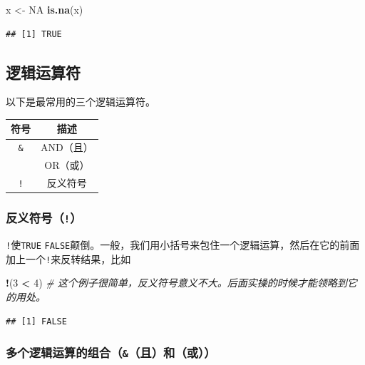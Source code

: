 \documentclass[]{book}
\newenvironment{Shaded}{\begin{snugshade}}{\end{snugshade}}
\newcommand{\CommentTok}[1]{\textcolor[rgb]{0.56,0.35,0.01}{\textit{#1}}}
\newcommand{\DecValTok}[1]{\textcolor[rgb]{0.00,0.00,0.81}{#1}}
\newcommand{\KeywordTok}[1]{\textcolor[rgb]{0.13,0.29,0.53}{\textbf{#1}}}
\newcommand{\NormalTok}[1]{#1}
\newcommand{\OperatorTok}[1]{\textcolor[rgb]{0.81,0.36,0.00}{\textbf{#1}}}
\newcommand{\OtherTok}[1]{\textcolor[rgb]{0.56,0.35,0.01}{#1}}
\newcommand{\StringTok}[1]{\textcolor[rgb]{0.31,0.60,0.02}{#1}}
\begin{document}
\begin{Shaded}
\begin{Highlighting}[]
\NormalTok{x <-}\StringTok{ }\OtherTok{NA}
\KeywordTok{is.na}\NormalTok{(x)}
\end{Highlighting}
\end{Shaded}

\begin{verbatim}
## [1] TRUE
\end{verbatim}

\hypertarget{logical-logical-operators}{%
\subsection{逻辑运算符}\label{logical-logical-operators}}

以下是最常用的三个逻辑运算符。

\begin{longtable}[]{@{}cc@{}}
\toprule
符号 & 描述\tabularnewline
\midrule
\endhead
\texttt{\&} & AND（且）\tabularnewline
\texttt{\textbar{}} & OR（或）\tabularnewline
\texttt{!} & 反义符号\tabularnewline
\bottomrule
\end{longtable}

\hypertarget{logical-logical-operators-anti}{%
\subsubsection{\texorpdfstring{反义符号（\texttt{!}）}{反义符号（!）}}\label{logical-logical-operators-anti}}

\texttt{!}使\texttt{TRUE} \texttt{FALSE}颠倒。一般，我们用小括号来包住一个逻辑运算，然后在它的前面加上一个\texttt{!}来反转结果，比如

\begin{Shaded}
\begin{Highlighting}[]
\OperatorTok{!}\NormalTok{(}\DecValTok{3} \OperatorTok{<}\StringTok{ }\DecValTok{4}\NormalTok{) }\CommentTok{# 这个例子很简单，反义符号意义不大。后面实操的时候才能领略到它的用处。}
\end{Highlighting}
\end{Shaded}

\begin{verbatim}
## [1] FALSE
\end{verbatim}

\hypertarget{logical-logical-operators-and-or}{%
\subsubsection{\texorpdfstring{多个逻辑运算的组合（\texttt{\&}（且）和\texttt{\textbar{}}（或））}{多个逻辑运算的组合（\&（且）和\textbar{}（或））}}\label{logical-logical-operators-and-or}}
\end{document}
